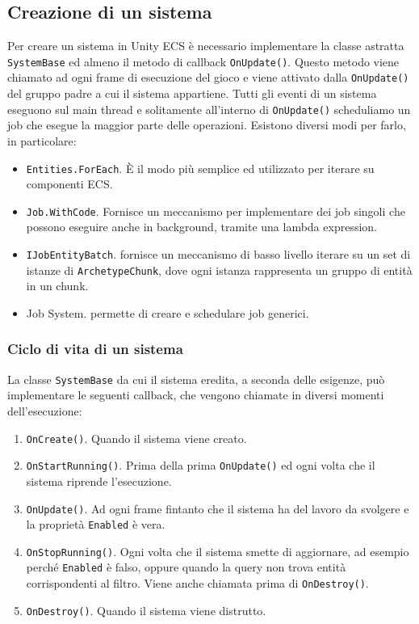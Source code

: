 \subsection{Creazione di un sistema}
Per creare un sistema in Unity ECS è necessario implementare la classe astratta \verb|SystemBase| ed almeno il metodo di callback \verb|OnUpdate()|. Questo metodo viene chiamato ad ogni frame di esecuzione del gioco e viene attivato dalla \verb|OnUpdate()| del gruppo padre a cui il sistema appartiene.
Tutti gli eventi di un sistema eseguono sul main thread e solitamente all'interno di \verb|OnUpdate()| scheduliamo un job che esegue la maggior parte delle operazioni. Esistono diversi modi per farlo, in particolare:
\begin{itemize}
    \item \verb|Entities.ForEach|. È il modo più semplice ed utilizzato per iterare su componenti ECS.
    \item \verb|Job.WithCode|. Fornisce un meccanismo per implementare dei job singoli che possono eseguire anche in background, tramite una lambda expression.
    \item \verb|IJobEntityBatch|. fornisce un meccanismo di basso livello iterare su un set di istanze di \verb|ArchetypeChunk|, dove ogni istanza rappresenta un gruppo di entità in un chunk.
    \item \Csh{} Job System. permette di creare e schedulare job \Csh{} generici.
\end{itemize}

\subsubsection{Ciclo di vita di un sistema}
La classe \verb|SystemBase| da cui il sistema eredita, a seconda delle esigenze, può implementare le seguenti callback, che vengono chiamate in diversi momenti dell'esecuzione:
\begin{enumerate}
    \item \verb|OnCreate()|. Quando il sistema viene creato.
    \item \verb|OnStartRunning()|. Prima della prima \verb|OnUpdate()| ed ogni volta che il sistema riprende l'esecuzione.
    \item \verb|OnUpdate()|. Ad ogni frame fintanto che il sistema ha del lavoro da svolgere e la proprietà \verb|Enabled| è vera.
    \item \verb|OnStopRunning()|. Ogni volta che il sistema smette di aggiornare, ad esempio perché \verb|Enabled| è falso, oppure quando la query non trova entità corrispondenti al filtro. Viene anche chiamata prima di \verb|OnDestroy()|.
    \item \verb|OnDestroy()|. Quando il sistema viene distrutto.
\end{enumerate}

